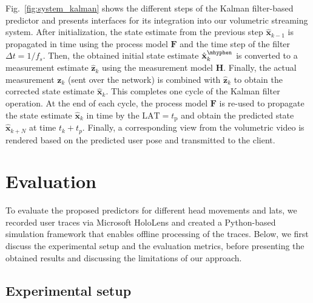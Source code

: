 \documentclass[sigconf]{acmart}			%
\newcommand{\matr}[1]{\mathrm{\mathbf{#1}}}
\begin{document}
Fig.~\ref{fig:system_kalman} shows the different steps of the Kalman filter-based predictor and presents interfaces for its integration into our volumetric streaming system.
After initialization, the state estimate from the previous step $\hat{\mathbf{x}}_{k-1}$ is propagated in time using the process model $\matr{F}$ and the time step of the filter $\Delta t=1/f_s$. 
Then, the obtained initial state estimate $\hat{\mathbf{x}}_{k}^\mhyphen$ is converted to a measurement estimate $\hat{\mathbf{z}}_k$ using the measurement model $\matr{H}$. 
Finally, the actual measurement $\mathbf{z}_k$ (sent over the network) is combined with $\hat{\mathbf{z}}_k$ to obtain the corrected state estimate $\hat{\mathbf{x}}_{k}$.
This completes one cycle of the Kalman filter operation. 
At the end of each cycle, the process model $\matr{F}$ is re-used to propagate the state estimate $\hat{\mathbf{x}}_{k}$ in time by the $\mathrm{LAT}=t_{\mathrm{p}}$ and obtain the predicted state $\hat{\mathbf{x}}_{k+N}$ at time $t_k+t_p$.
Finally, a corresponding view from the volumetric video is rendered based on the predicted user pose and transmitted to the client.

\section{Evaluation}
\label{sec:evaluation}
To evaluate the proposed predictors for different head movements and \glspl{lat}, we recorded user traces via Microsoft HoloLens and created a Python-based simulation framework that enables offline processing of the traces.
Below, we first discuss the experimental setup and the evaluation metrics, before presenting the obtained results and discussing the limitations of our approach.

\subsection{Experimental setup}
\label{sec:exp_setup}
\end{document}
